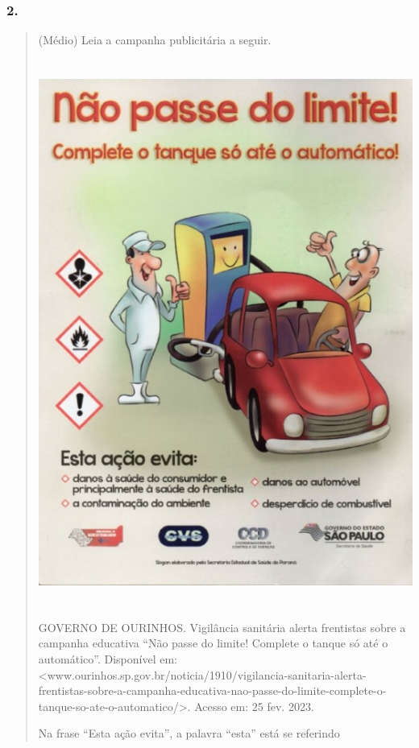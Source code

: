 \subsubsection{2. }\label{section-78}

\begin{quote}
(Médio) Leia a campanha publicitária a seguir.

\includegraphics[width=5.20833in,height=7.05556in]{media/image35.jpeg}

GOVERNO DE OURINHOS. Vigilância sanitária alerta frentistas sobre a
campanha educativa ``Não passe do limite! Complete o tanque só até o
automático''. Disponível em:
\textless{}www.ourinhos.sp.gov.br/noticia/1910/vigilancia-sanitaria-alerta-frentistas-sobre-a-campanha-educativa-nao-passe-do-limite-complete-o-tanque-so-ate-o-automatico/\textgreater{}.
Acesso em: 25 fev. 2023.

Na frase ``Esta ação evita'', a palavra ``esta'' está se referindo


\end{quote}
